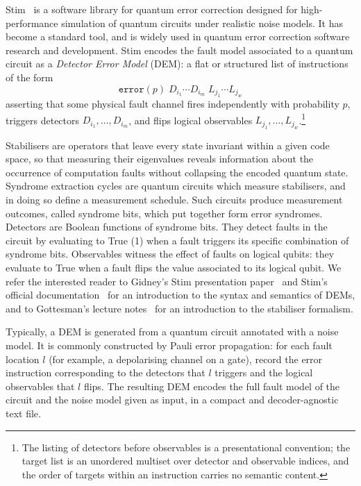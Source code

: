 \documentclass[11pt,a4paper]{article}
\begin{document}
Stim~\cite{gidney2021stim} is a software library for quantum error correction designed for high-performance simulation of quantum circuits under realistic noise models. It has become a standard tool, and is widely used in quantum error correction software research and development. Stim encodes the fault model associated to a quantum circuit as a \emph{Detector Error Model} (DEM): a flat or structured list of
instructions of the form
\[
  \texttt{error}(p)\; D_{i_1}\cdots D_{i_m}\; L_{j_1}\cdots L_{j_w}
\]
asserting that some physical fault channel fires independently with
probability $p$, triggers detectors $D_{i_1},\ldots,D_{i_m}$, and
flips logical observables $L_{j_1},\ldots,L_{j_w}$.\footnote{The listing of detectors before observables is a presentational convention;
the target list is an unordered multiset over detector and observable indices,
and the order of targets within an instruction carries no semantic content.
}

Stabilisers are operators that leave every state invariant within a given code space, so that measuring their eigenvalues reveals information about the occurrence of computation faults without collapsing the encoded quantum state. Syndrome extraction cycles are quantum circuits which measure stabilisers, and in doing so define a measurement schedule. Such circuits produce measurement outcomes, called syndrome bits, which put together form error syndromes. Detectors are Boolean functions of syndrome bits. They detect faults in the circuit by evaluating to True (1) when a fault triggers its specific combination of syndrome bits.
Observables witness the effect of faults on logical qubits: they evaluate to True when a fault flips the value associated to its logical qubit. We refer the interested reader to Gidney's Stim presentation paper~\cite{gidney2021stim} and Stim's official documentation~\cite{stimdocs} for an introduction to the syntax and semantics of DEMs, and to Gottesman's lecture notes~\cite{gottesman2009qec} for an introduction to the stabiliser formalism.

Typically, a DEM is generated from a quantum circuit annotated with a noise model. It is commonly constructed by Pauli error propagation: for each fault location $l$ (for example, a depolarising channel on a gate), record the error instruction corresponding to the detectors that $l$ triggers and the logical observables that $l$ flips. The resulting DEM encodes the full fault model of the circuit and the noise model given as input, in a compact and decoder-agnostic text file.
\end{document}
